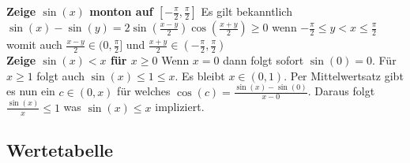 \documentclass[25pt]{sciposter}
\begin{document}
\begin{multicols}{3}
\textbf{Zeige $\sin(x)$ monton auf $[-\frac{\pi}{2}, \frac{\pi}{2}]$} Es gilt bekanntlich $\sin(x) - \sin(y) =  2 \sin \left(\frac{x-y}{2}\right) \cos \left(\frac{x+y}{2}\right) \geq 0$ wenn $-\frac{\pi}{2} \leq y < x \leq \frac{\pi}{2}$ womit auch $\frac{x-y}{2} \in (0,\frac{\pi}{2}]$ und $\frac{x+y}{2} \in (- \frac{\pi}{2}, \frac{\pi}{2})$\\


\textbf{Zeige $\sin(x) < x$ für $x \geq 0$}
Wenn $x = 0$ dann folgt sofort $\sin(0) = 0$. Für $x\geq 1$ folgt auch $\sin(x) \leq 1 \leq x$. Es bleibt $x \in (0,1)$. Per Mittelwertsatz gibt es nun ein $c \in (0,x)$ für welches $\cos(c) = \frac{\sin(x) - \sin(0)}{x - 0}$. Daraus folgt $\frac{\sin(x)}{x} \leq 1$ was $\sin(x) \leq x$ impliziert.



\subsection*{Wertetabelle}




\end{multicols}
\end{document}
